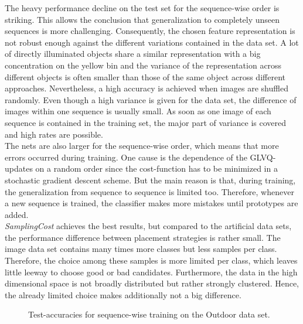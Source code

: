 \documentclass[conference]{IEEEtran}
\begin{document}
The heavy performance decline on the test set for the sequence-wise order is striking. This allows the conclusion that generalization to completely unseen sequences is more challenging.
Consequently, the chosen feature representation is not robust enough against the different variations contained in the data set. 
A lot of directly illuminated objects share a similar representation with a big concentration on the yellow bin and the variance
of the representation across different objects is often smaller than those of the same object across different approaches.
Nevertheless, a high accuracy is achieved 
when images are shuffled randomly. Even though a high variance is given for the data set, the difference of images within one sequence is usually small. 
As soon as one image of each sequence is contained in the training set, the major part of variance is covered and high rates are possible. \\
The nets are also larger for the sequence-wise order, which means that more errors occurred during training. One cause is the dependence of the GLVQ-updates 
on a random order since the cost-function has to be minimized in a stochastic gradient descent scheme. But the main reason is that, during
training, the generalization from sequence to sequence is limited too. Therefore, whenever a new sequence is trained, the classifier makes more mistakes until prototypes are added.\\
\textit{SamplingCost} achieves the best results, but compared to the artificial data sets, the performance difference between placement strategies is rather small.
The image data set contains many times more classes but less samples per class. Therefore, the choice among these samples is more limited per class, which leaves
little leeway to choose good or bad candidates. Furthermore, the data in the high dimensional space is not broadly distributed but rather strongly clustered. 
Hence, the already limited choice makes additionally not a big difference.
\begin{figure}
\centering
        \caption{Test-accuracies for sequence-wise training on the Outdoor data set.}
        \label{fig:OutdoorChunkWise}
\end{figure}
\end{document}
